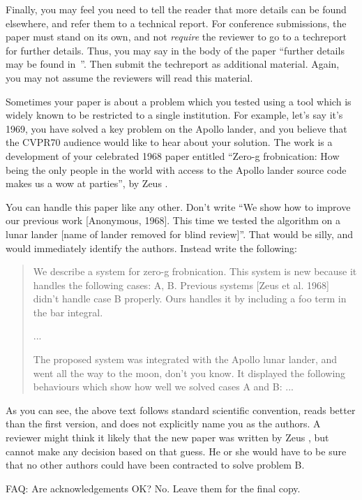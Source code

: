 \documentclass[10pt,twocolumn,letterpaper]{article}
\begin{document}
Finally, you may feel you need to tell the reader that more details can be
found elsewhere, and refer them to a technical report.  For conference
submissions, the paper must stand on its own, and not {\em require} the
reviewer to go to a techreport for further details.  Thus, you may say in
the body of the paper ``further details may be found
in~\cite{Authors14b}''.  Then submit the techreport as additional material.
Again, you may not assume the reviewers will read this material. 

Sometimes your paper is about a problem which you tested using a tool which
is widely known to be restricted to a single institution.  For example,
let's say it's 1969, you have solved a key problem on the Apollo lander,
and you believe that the CVPR70 audience would like to hear about your
solution.  The work is a development of your celebrated 1968 paper entitled
``Zero-g frobnication: How being the only people in the world with access to
the Apollo lander source code makes us a wow at parties'', by Zeus \etal.

You can handle this paper like any other.  Don't write ``We show how to
improve our previous work [Anonymous, 1968].  This time we tested the
algorithm on a lunar lander [name of lander removed for blind review]''.
That would be silly, and would immediately identify the authors. Instead
write the following:
\begin{quotation}
\noindent
   We describe a system for zero-g frobnication.  This
   system is new because it handles the following cases:
   A, B.  Previous systems [Zeus et al. 1968] didn't
   handle case B properly.  Ours handles it by including
   a foo term in the bar integral.

   ...

   The proposed system was integrated with the Apollo
   lunar lander, and went all the way to the moon, don't
   you know.  It displayed the following behaviours
   which show how well we solved cases A and B: ...
\end{quotation}
As you can see, the above text follows standard scientific convention,
reads better than the first version, and does not explicitly name you as
the authors.  A reviewer might think it likely that the new paper was
written by Zeus \etal, but cannot make any decision based on that guess.
He or she would have to be sure that no other authors could have been
contracted to solve problem B.

FAQ: Are acknowledgements OK?  No.  Leave them for the final copy.
\end{document}
